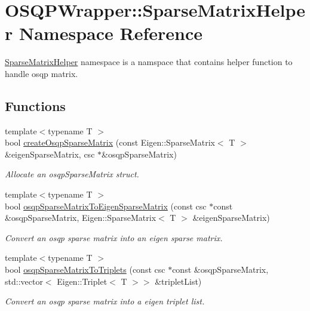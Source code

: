 \section{O\+S\+Q\+P\+Wrapper\+:\+:Sparse\+Matrix\+Helper Namespace Reference}
\label{namespaceOSQPWrapper_1_1SparseMatrixHelper}


\hyperlink{namespaceOSQPWrapper_1_1SparseMatrixHelper}{Sparse\+Matrix\+Helper} namespace is a namspace that contains helper function to handle osqp matrix.  


\subsection*{Functions}
\begin{DoxyCompactItemize}
\item 
{\footnotesize template$<$typename T $>$ }\\bool \hyperlink{namespaceOSQPWrapper_1_1SparseMatrixHelper_aa363c7e41f52f1b871a432b334be1ae8}{create\+Osqp\+Sparse\+Matrix} (const Eigen\+::\+Sparse\+Matrix$<$ T $>$ \&eigen\+Sparse\+Matrix, csc $\ast$\&osqp\+Sparse\+Matrix)
\begin{DoxyCompactList}\small\item\em Allocate an osqp\+Sparse\+Matrix struct. \end{DoxyCompactList}\item 
{\footnotesize template$<$typename T $>$ }\\bool \hyperlink{namespaceOSQPWrapper_1_1SparseMatrixHelper_a772dc23fcd9655a758c5a92091e8dafe}{osqp\+Sparse\+Matrix\+To\+Eigen\+Sparse\+Matrix} (const csc $\ast$const \&osqp\+Sparse\+Matrix, Eigen\+::\+Sparse\+Matrix$<$ T $>$ \&eigen\+Sparse\+Matrix)
\begin{DoxyCompactList}\small\item\em Convert an osqp sparse matrix into an eigen sparse matrix. \end{DoxyCompactList}\item 
{\footnotesize template$<$typename T $>$ }\\bool \hyperlink{namespaceOSQPWrapper_1_1SparseMatrixHelper_a2661f2bc678993ad0016a1bd672b1988}{osqp\+Sparse\+Matrix\+To\+Triplets} (const csc $\ast$const \&osqp\+Sparse\+Matrix, std\+::vector$<$ Eigen\+::\+Triplet$<$ T $>$$>$ \&triplet\+List)
\begin{DoxyCompactList}\small\item\em Convert an osqp sparse matrix into a eigen triplet list. \end{DoxyCompactList}\item 
$$
\end{DoxyCompactItemize}
